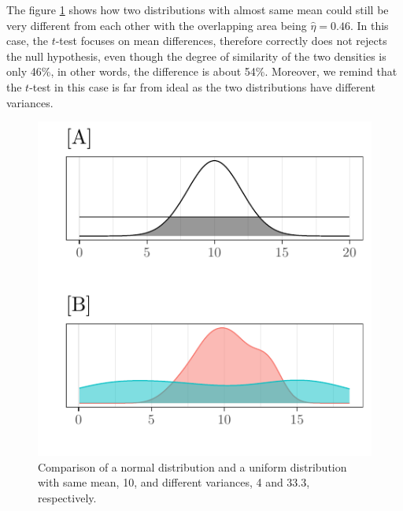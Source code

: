 \documentclass[twocolumn]{article}\usepackage[]{graphicx}\usepackage[]{xcolor}
\makeatletter
\def\maxwidth{ %
  \ifdim\Gin@nat@width>\linewidth
    \linewidth
  \else
    \Gin@nat@width
  \fi
}
\newenvironment{knitrout}{}{} %
\makeatother
\begin{document}
\vspace{.3cm}


The figure \ref{fig:equalmeans} shows how two distributions with almost same mean could still be very different from each other with the overlapping area being $\hat{\eta} = 0.46$. In this case, the $t$-test focuses on mean differences, therefore correctly does not rejects the null hypothesis, even though the degree of similarity of the two densities is only 46\%, in other words, the difference is about 54\%. Moreover, we remind that the $t$-test in this case is far from ideal as the two distributions have different variances.




\begin{knitrout}
\color{fgcolor}\begin{figure}

{\centering \includegraphics[width=\maxwidth]{figure/equalmeans-1} 

}

\caption[Comparison of a normal distribution and a uniform distribution with same mean, 10, and different variances, 4 and 33.3, respectively]{Comparison of a normal distribution and a uniform distribution with same mean, 10, and different variances, 4 and 33.3, respectively.}\label{fig:equalmeans}
\end{figure}

\end{knitrout}
\end{document}
